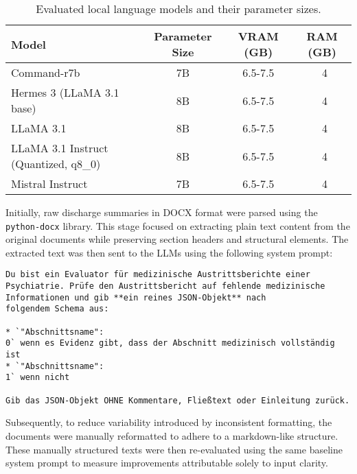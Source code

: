 \begin{table}[H]
\centering
\begin{tabular}{l c c c}
\toprule
    \textbf{Model} & \textbf{Parameter Size} & \textbf{VRAM (GB)} & \textbf{RAM
    (GB)} \\ 
\midrule
    Command-r7b & 7B & 6.5-7.5 & ~4 \\
    Hermes 3 (LLaMA 3.1 base) & 8B & 6.5-7.5 & ~4  \\
    LLaMA 3.1 & 8B & 6.5-7.5 & ~4  \\
    LLaMA 3.1 Instruct (Quantized, q8\_0) & 8B & 6.5-7.5 & ~4  \\
    Mistral Instruct & 7B & 6.5-7.5 & ~4  \\
\bottomrule
\end{tabular}
\caption{Evaluated local language models and their parameter sizes.}
\label{tab:llm_models}
\end{table}
\clearpage

Initially, raw discharge summaries in DOCX format were parsed 
using the \texttt{python-docx} library. This stage focused on extracting 
plain text content from the original documents while preserving section 
headers and structural elements. The extracted text was then sent to the LLMs
using the following system prompt:
\begin{promptbox}
\begin{verbatim}
Du bist ein Evaluator für medizinische Austrittsberichte einer 
Psychiatrie. Prüfe den Austrittsbericht auf fehlende medizinische 
Informationen und gib **ein reines JSON-Objekt** nach 
folgendem Schema aus:

* `"Abschnittsname": 
0` wenn es Evidenz gibt, dass der Abschnitt medizinisch vollständig ist
* `"Abschnittsname": 
1` wenn nicht

Gib das JSON-Objekt OHNE Kommentare, Fließtext oder Einleitung zurück.
\end{verbatim}
\end{promptbox}

Subsequently, to reduce variability introduced by inconsistent formatting, 
the documents were manually reformatted to adhere to a markdown-like structure. 
These manually structured texts were then re-evaluated using the same baseline 
system prompt to measure improvements attributable solely to input clarity.

